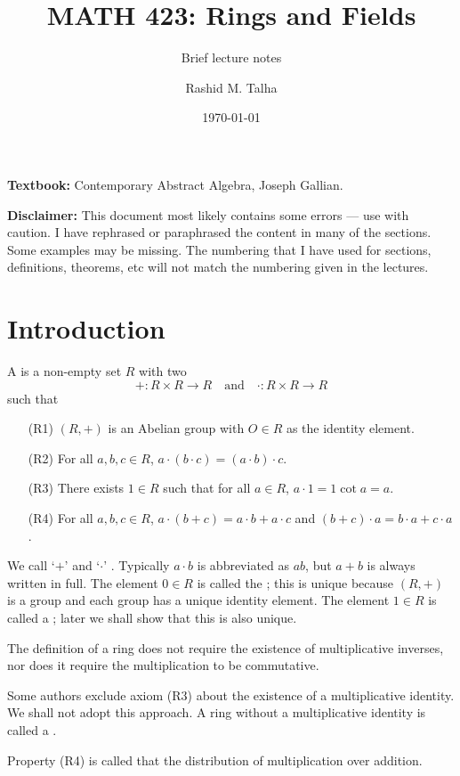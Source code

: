 \documentclass[11pt]{penrose}
\title{MATH 423: Rings and Fields}
\subtitle{Brief lecture notes}
\author{Rashid M. Talha}
\affiliation{School of Natural Sciences, NUST}
\date{\today}
\begin{document}
\maketitle

\textbf{Textbook:} Contemporary Abstract Algebra, Joseph Gallian.

\textbf{Disclaimer:} This document most likely contains some errors --- use with caution. I have rephrased or paraphrased the content in many of the sections. Some examples may be missing. The numbering that I have used for sections, definitions, theorems, etc will not match the numbering given in the lectures.

\section{Introduction}
\begin{ndfn}
    A  is a non-empty set $R$ with two 
    \begin{equation*}
        + : R \times R \to R
        \quad\text{and}\quad
        \cdot : R \times R \to R
    \end{equation*}
    such that
    \begin{enumerate}
        \item[(R1)] $(R,+)$ is an Abelian group with $O \in R$ as the identity element.
        \item[(R2)] For all $a, b, c \in R$, $a \cdot (b \cdot c) = (a \cdot b) \cdot c$.
        \item[(R3)] There exists $1 \in R$ such that for all $a \in R$, $a \cdot 1 = 1 \cot a = a$.
        \item[(R4)] For all $a, b, c \in R$, $a \cdot (b + c) = a \cdot b + a \cdot c$ and $(b+c) \cdot a = b \cdot a + c \cdot a$.
    \end{enumerate}
\end{ndfn}

\begin{notation}
    We call `$+$'  and `$\cdot$' . Typically $a \cdot b$ is abbreviated as $ab$, but $a+b$ is always written in full. The element $0 \in R$ is called the ; this is unique because $(R,+)$ is a group and each group has a unique identity element. The element $1 \in R$ is called a ; later we shall show that this is also unique.
\end{notation}

\begin{remark}
    The definition of a ring does not require the existence of multiplicative inverses, nor does it require the multiplication to be commutative.

    Some authors exclude axiom (R3) about the existence of a multiplicative identity. We shall not adopt this approach. A ring without a multiplicative identity is called a .

    Property (R4) is called that the distribution of multiplication over addition.
\end{remark}
\end{document}
